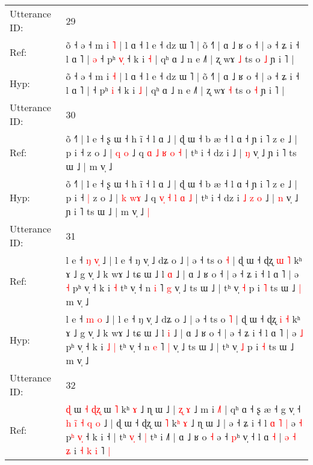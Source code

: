 \documentclass[10pt]{article}
\DeclareRobustCommand{\hl}[1]{{\textcolor{red}{#1}}}
\begin{document}
\begin{longtable}{ll}
 \\
\midrule
Utterance ID: & 29 \\
Ref: & õ ˧ ə ˧ m i \hl{˥} | l ɑ ˧ l e ˧ dz ɯ ˥ | õ ˧˥ | ɑ ˩ ʁ o ˧ | ə ˧ ʑ i ˧ l ɑ ˥ |\hl{ }\hl{ə} ˧ pʰ \hl{v}\hl{̩} ˧ k i \hl{˧} | qʰ ɑ ˩ n e ˩˥ | ʐ wɤ \hl{˩} ts o \hl{˩} ɲ i ˥ |
 \\
Hyp: & õ ˧ ə ˧ m i \hl{˧} | l ɑ ˧ l e ˧ dz ɯ ˥ | õ ˧˥ | ɑ ˩ ʁ o ˧ | ə ˧ ʑ i ˧ l ɑ ˥ |\hl{}\hl{} ˧ pʰ \hl{}\hl{i} ˧ k i \hl{˩} | qʰ ɑ ˩ n e ˩˥ | ʐ wɤ \hl{˧} ts o \hl{˧} ɲ i ˥ |
 \\
\midrule
Utterance ID: & 30 \\
Ref: & õ ˧˥ | l e ˧ ʂ ɯ ˧ h ĩ ˧ l ɑ ˩ | ɖ ɯ ˧ b æ ˧ l ɑ ˧ ɲ i ˥ z e ˩ | p i ˧\hl{}\hl{} z o ˩ | \hl{q} \hl{}\hl{o} ˩ q \hl{}\hl{ɑ} \hl{˩} \hl{ʁ} \hl{o} \hl{˧} | tʰ i ˧ dz i\hl{}\hl{}\hl{}\hl{}\hl{}\hl{} ˩ | \hl{ŋ} v̩ ˩ ɲ i ˥ ts ɯ ˩ | m v̩ ˩\hl{}\hl{}
 \\
Hyp: & õ ˧˥ | l e ˧ ʂ ɯ ˧ h ĩ ˧ l ɑ ˩ | ɖ ɯ ˧ b æ ˧ l ɑ ˧ ɲ i ˥ z e ˩ | p i ˧\hl{ }\hl{|} z o ˩ | \hl{k} \hl{w}\hl{ɤ} ˩ q \hl{v}\hl{̩} \hl{˧} \hl{l} \hl{ɑ} \hl{˩} | tʰ i ˧ dz i\hl{ }\hl{˩}\hl{ }\hl{z}\hl{ }\hl{o} ˩ | \hl{n} v̩ ˩ ɲ i ˥ ts ɯ ˩ | m v̩ ˩\hl{ }\hl{|}
 \\
\midrule
Utterance ID: & 31 \\
Ref: & l e ˧ \hl{ŋ} \hl{v}\hl{̩} ˩ | l e ˧ ŋ v̩ ˩ dʑ o ˩ | ə ˧ ts o \hl{˧} | ɖ ɯ ˧ ɖʐ \hl{ɯ} \hl{˥} kʰ ɤ ˩ g v̩ ˩ k wɤ ˩ tɕ ɯ ˩ l \hl{ɑ} ˩ | ɑ ˩ ʁ o ˧ | ə ˧ ʑ i ˧ l ɑ ˥ | ə \hl{˧} pʰ v̩ ˧ k i\hl{}\hl{} \hl{˧} tʰ v̩ ˧ n \hl{i} ˥ \hl{g} v̩ ˩ ts ɯ ˩ | tʰ v̩ \hl{˧} p i \hl{˥} ts ɯ ˩\hl{ }\hl{|} m v̩ ˩
 \\
Hyp: & l e ˧ \hl{m} \hl{}\hl{o} ˩ | l e ˧ ŋ v̩ ˩ dʑ o ˩ | ə ˧ ts o \hl{˥} | ɖ ɯ ˧ ɖʐ \hl{i} \hl{˧} kʰ ɤ ˩ g v̩ ˩ k wɤ ˩ tɕ ɯ ˩ l \hl{i} ˩ | ɑ ˩ ʁ o ˧ | ə ˧ ʑ i ˧ l ɑ ˥ | ə \hl{˩} pʰ v̩ ˧ k i\hl{ }\hl{˩} \hl{|} tʰ v̩ ˧ n \hl{e} ˥ \hl{|} v̩ ˩ ts ɯ ˩ | tʰ v̩ \hl{˩} p i \hl{˧} ts ɯ ˩\hl{}\hl{} m v̩ ˩
 \\
\midrule
Utterance ID: & 32 \\
Ref: & \hl{ɖ}\hl{ }ɯ\hl{ }\hl{˧} \hl{ɖ}\hl{ʐ} ɯ \hl{˥} kʰ \hl{ɤ} ˩ ɳ ɯ ˩ | \hl{ʐ} \hl{ɤ} ˩ m i \hl{˩}˥ | qʰ ɑ ˧ ʂ æ ˧ g v̩ ˧\hl{ }\hl{h}\hl{ }\hl{i}\hl{̃} \hl{˧} \hl{q}\hl{ }\hl{o} ˩ | ɖ ɯ ˧ ɖʐ ɯ \hl{˥} k\hl{ʰ}\hl{ }\hl{ɤ} ˩ ɳ ɯ ˩ | ə ˧ ʑ i ˧ l\hl{ }\hl{ɑ}\hl{ }\hl{˥} \hl{|} ə \hl{˧} p\hl{ʰ} \hl{v}\hl{̩} ˧ k i ˧ | tʰ \hl{v}\hl{̩} ˧\hl{ }\hl{|} tʰ i ˩˥ | ɑ ˩ ʁ o\hl{}\hl{} \hl{˧} ə ˧ \hl{p}ʰ v̩ ˧ l ɑ \hl{˧} |\hl{ }\hl{ə} \hl{˧}\hl{ }\hl{ʑ} i\hl{ }\hl{˧}\hl{ }\hl{k} \hl{i}\hl{ }˥\hl{ }\hl{|}
 \\

\end{longtable}
\end{document}
